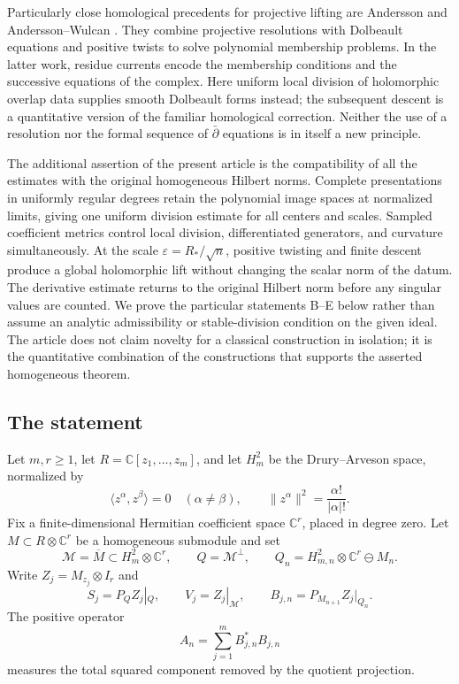 \documentclass[11pt,reqno]{amsart}
\numberwithin{equation}{section}
\theoremstyle{definition}
\theoremstyle{remark}
\newcommand{\C}{\mathbb C}
\begin{document}
Particularly close homological precedents for projective lifting are Andersson
\cite[Section~2]{AnderssonMembership} and Andersson--Wulcan
\cite[Section~6, Proposition~6.1]{AnderssonWulcan}. They combine projective
resolutions with Dolbeault equations and positive twists to solve polynomial
membership problems. In the latter work, residue currents encode the
membership conditions and the successive equations of the complex. Here
uniform local division of holomorphic overlap data supplies smooth
Dolbeault forms instead; the subsequent descent is a quantitative version
of the familiar homological correction. Neither the use of a resolution
nor the formal sequence of $\bar\partial$ equations is in itself a new
principle.

The additional assertion of the present article is the compatibility of
all the estimates with the original homogeneous Hilbert norms. Complete
presentations in uniformly regular degrees retain the polynomial image
spaces at normalized limits, giving one uniform division estimate for
all centers and scales. Sampled coefficient metrics control local division,
differentiated generators, and curvature simultaneously. At the scale
$\varepsilon=R_*/\sqrt n$, positive twisting and finite descent produce
a global holomorphic lift without changing the scalar norm of the datum.
The derivative estimate returns to the original Hilbert norm before any
singular values are counted. We prove the particular statements B--E
below rather than assume an analytic admissibility or stable-division
condition on the given ideal. The article does not claim novelty for a
classical construction in isolation; it is the quantitative combination
of the constructions that supports the asserted homogeneous theorem.



\subsection{The statement}
Let $m,r\ge1$, let $R=\C[z_1,\ldots,z_m]$, and let $H_m^2$ be the Drury--Arveson space,
normalized by
\[
 \langle z^\alpha,z^\beta\rangle=0\quad(\alpha\ne\beta),
 \qquad \|z^\alpha\|^2=\frac{\alpha!}{|\alpha|!}.
\]
Fix a finite-dimensional Hermitian coefficient space $\C^r$, placed in
degree zero.  Let $M\subset R\otimes\C^r$ be a homogeneous submodule and set
\[
 \mathcal M=\overline M\subset H_m^2\otimes\C^r,\qquad
 Q=\mathcal M^\perp,\qquad Q_n=H_{m,n}^2\otimes\C^r\ominus M_n.
\]
Write $Z_j=M_{z_j}\otimes I_r$ and
\[
 S_j=P_QZ_j|_Q,\qquad V_j=Z_j|_{\mathcal M},\qquad
 B_{j,n}=P_{M_{n+1}}Z_j|_{Q_n}.
\]
The positive operator
\begin{equation}\label{eq:intro-defect}
 A_n=\sum_{j=1}^m B_{j,n}^*B_{j,n}
\end{equation}
measures the total squared component removed by the quotient projection.
\end{document}
